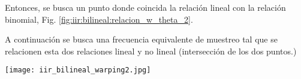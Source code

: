 \documentclass[informe.tex]{subfiles}
\begin{document}
{Entonces, se busca un punto donde coincida la relación lineal con la relación binomial, Fig. \ref{fig:iir:bilineal:relacion_w_theta_2}.\newline
 
A continuación se busca una frecuencia equivalente de muestreo tal que se relacionen esta dos relaciones lineal y no lineal (intersección de los dos puntos.)\newline

\begin{center}
	\texttt{[image: iir\_bilineal\_warping2.jpg]}	
\end{center}

}
\end{document}
